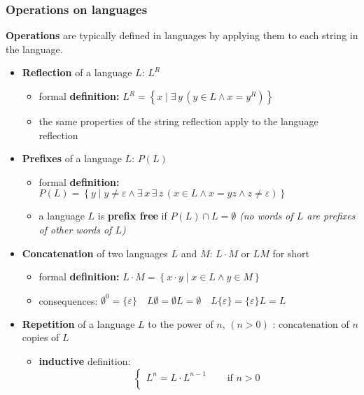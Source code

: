 \documentclass[english]{article}
\begin{document}
\subsubsection{Operations on languages}

\textbf{Operations} are typically defined in languages by applying them to each string in the language.

\begin{itemize}
  \item \textbf{Reflection} of a language \(L\): \(L^R\)
        \begin{itemize}
          \item formal \textbf{definition:} \(L^R = \left\{x \mid \exists \, y \, (y \in L \land x = y^R) \right\}\)
          \item the same properties of the string reflection apply to the language reflection
        \end{itemize}
  \item \textbf{Prefixes} of a language \(L\): \(P(L)\)
        \begin{itemize}
          \item formal \textbf{definition:} \(P(L) = \left\{y \mid y \neq \varepsilon \land \exists \, x \, \exists \, z \, (x \in L \land x = yz \land z \neq \varepsilon) \right\}\)
          \item a language \(L\) is \textbf{prefix free} if \(P(L) \cap L = \emptyset\) \textit{(no words of \(L\) are prefixes of other words of \(L\))}
        \end{itemize}
  \item \textbf{Concatenation} of two languages \(L\) and \(M\): \(L \cdot M\) or \(LM\) for short
        \begin{itemize}
          \item formal \textbf{definition:} \(L \cdot M = \left\{x \cdot y \mid x \in L \land y \in M \right\}\)
          \item consequences: \(\emptyset^0 = \{\varepsilon\} \quad L \emptyset = \emptyset L = \emptyset \quad L \{\varepsilon\} = \{\varepsilon\} L = L\)
        \end{itemize}
  \item \textbf{Repetition} of a language \(L\) to the power of \(n, \, (n > 0)\) : concatenation of \(n\) copies of \(L\)
        \begin{itemize}
          \item \textbf{inductive} definition: \[\begin{cases}
                    L ^ n = L \cdot L ^ {n - 1} \quad & \text{ if } n > 0  \\

\end{cases}\]
\end{itemize}
\end{itemize}
\end{document}
